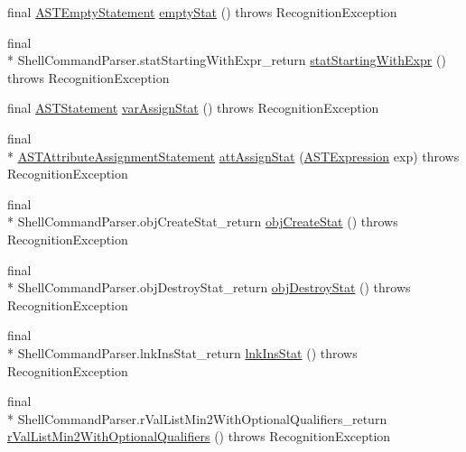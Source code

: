 \begin{DoxyCompactItemize}
\item 
final \hyperlink{classorg_1_1tzi_1_1use_1_1parser_1_1soil_1_1ast_1_1_a_s_t_empty_statement}{A\-S\-T\-Empty\-Statement} \hyperlink{classorg_1_1tzi_1_1use_1_1parser_1_1shell_1_1_shell_command_parser_ab98aba903815e7fbe89db9988cf071de}{empty\-Stat} ()  throws Recognition\-Exception 
\item 
final \\*
Shell\-Command\-Parser.\-stat\-Starting\-With\-Expr\-\_\-return \hyperlink{classorg_1_1tzi_1_1use_1_1parser_1_1shell_1_1_shell_command_parser_a816c8e64571f19e40188b23f02044439}{stat\-Starting\-With\-Expr} ()  throws Recognition\-Exception 
\item 
final \hyperlink{classorg_1_1tzi_1_1use_1_1parser_1_1soil_1_1ast_1_1_a_s_t_statement}{A\-S\-T\-Statement} \hyperlink{classorg_1_1tzi_1_1use_1_1parser_1_1shell_1_1_shell_command_parser_a7a1026a6343cc9166a19aa26c94c51a5}{var\-Assign\-Stat} ()  throws Recognition\-Exception 
\item 
final \\*
\hyperlink{classorg_1_1tzi_1_1use_1_1parser_1_1soil_1_1ast_1_1_a_s_t_attribute_assignment_statement}{A\-S\-T\-Attribute\-Assignment\-Statement} \hyperlink{classorg_1_1tzi_1_1use_1_1parser_1_1shell_1_1_shell_command_parser_a57d8d1426b2d73998fe60e16047e8c52}{att\-Assign\-Stat} (\hyperlink{classorg_1_1tzi_1_1use_1_1parser_1_1ocl_1_1_a_s_t_expression}{A\-S\-T\-Expression} exp)  throws Recognition\-Exception 
\item 
final \\*
Shell\-Command\-Parser.\-obj\-Create\-Stat\-\_\-return \hyperlink{classorg_1_1tzi_1_1use_1_1parser_1_1shell_1_1_shell_command_parser_ac71aa3c5b058e82bd6038970c55b009f}{obj\-Create\-Stat} ()  throws Recognition\-Exception 
\item 
final \\*
Shell\-Command\-Parser.\-obj\-Destroy\-Stat\-\_\-return \hyperlink{classorg_1_1tzi_1_1use_1_1parser_1_1shell_1_1_shell_command_parser_a4aac2d0711c6bd1e64d3b9f4da89986c}{obj\-Destroy\-Stat} ()  throws Recognition\-Exception 
\item 
final \\*
Shell\-Command\-Parser.\-lnk\-Ins\-Stat\-\_\-return \hyperlink{classorg_1_1tzi_1_1use_1_1parser_1_1shell_1_1_shell_command_parser_a872cf7d6d15d4ecd4ad2b0ae0dd16312}{lnk\-Ins\-Stat} ()  throws Recognition\-Exception 
\item 
final \\*
Shell\-Command\-Parser.\-r\-Val\-List\-Min2\-With\-Optional\-Qualifiers\-\_\-return \hyperlink{classorg_1_1tzi_1_1use_1_1parser_1_1shell_1_1_shell_command_parser_ace3875da857a73d98ccef7ce70c63681}{r\-Val\-List\-Min2\-With\-Optional\-Qualifiers} ()  throws Recognition\-Exception 

\end{DoxyCompactItemize}
